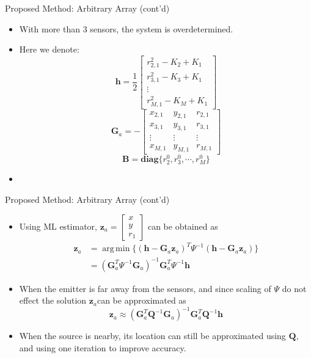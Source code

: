\documentclass[10pt]{beamer}
\DeclareMathOperator*{\argmin}{arg\,min}
\begin{document}
\begin{frame}{Proposed Method: Arbitrary Array (cont'd)}
  \begin{itemize}
    \item With more than 3 sensors, the system is overdetermined.
    \item Here we denote:
            $$\mathbf{h}= \frac{1}{2}
              \begin{bmatrix}r_{2,1}^2-K_2+K_1 \\
                             r_{3,1}^2-K_3+K_1 \\
                             \vdots \\
                             r_{M,1}^2-K_M+K_1\end{bmatrix}$$
            $$\mathbf{G}_a=-
              \begin{bmatrix} x_{2,1} & y_{2,1} & r_{2,1} \\
                              x_{3,1} & y_{3,1} & r_{3,1} \\
                              \vdots  & \vdots  & \vdots  \\
                              x_{M,1} & y_{M,1} & r_{M,1} \end{bmatrix}$$
            $$\mathbf{B}= \textbf{diag} \{r_2^0,r_3^0,\cdots,r_M^0\}$$
    \item
  \end{itemize}
\end{frame}

\begin{frame}{Proposed Method: Arbitrary Array (cont'd)}
  \begin{itemize}
    \item Using ML estimator, $\mathbf{z}_a=\begin{bmatrix}x\\y\\r_1\end{bmatrix}$ can be obtained as
          $$\begin{aligned}
            \mathbf{z}_a&=\argmin\{(\mathbf{h}-\mathbf{G}_a\mathbf{z}_a)^T
                                    \Psi^{-1}(\mathbf{h}-\mathbf{G}_a\mathbf{z}_a)\}\\
                        &=(\mathbf{G}_a^T\Psi^{-1}\mathbf{G}_a)^{-1}\mathbf{G}_a^T\Psi^{-1}\mathbf{h}
            \end{aligned}$$
    \item When the emitter is far away from the sensors,
          and since scaling of $\Psi$ do not effect the solution
          $\mathbf{z}_a$can be approximated as
          $$\mathbf{z}_a\approx(\mathbf{G}_a^T\mathbf{Q}^{-1}
            \mathbf{G}_a)^{-1}\mathbf{G}_a^T\mathbf{Q}^{-1}\mathbf{h}$$
    \item When the source is nearby, its location can still be approximated
          using $\mathbf{Q}$, and using one iteration to improve accuracy.
  \end{itemize}
\end{frame}
\end{document}
